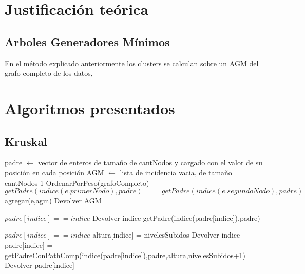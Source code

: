 \documentclass[8pt,a4paper]{article}
\begin{document}
\section{Justificación teórica}

\subsection{Arboles Generadores Mínimos}
En el método explicado anteriormente los clusters se calculan sobre un AGM del grafo completo de los datos, 

\section{Algoritmos presentados}

\subsection{Kruskal}
\begin{codebox}
		\li padre $\gets$ vector de enteros de tamaño de cantNodos y cargado con el valor de su posición en cada posición
		\li AGM $\gets$ lista de incidencia vacia, de tamaño cantNodos-1
		\li OrdenarPorPeso(grafoCompleto)
		\li {} 
			\li \Do
			\li \If $getPadre(indice(e.primerNodo), padre) == getPadre(indice(e.segundoNodo),padre)$
				\li \Then agregar(e,agm)
					\End
				\End
	\li Devolver AGM
\end{codebox}

\begin{codebox}
\li \If $padre[indice] == indice$ \Then
\li Devolver indice
\li \Else
\li getPadre(indice(padre[indice]),padre)
\li \End
\end{codebox}


\begin{codebox}
\li \If $padre[indice] == indice$ \Then
\li altura[indice] = nivelesSubidos
\li Devolver indice
\li \Else
\li padre[indice] = getPadreConPathComp(indice(padre[indice]),padre,altura,nivelesSubidos+1)
\li Devolver padre[indice]
\li \End
\end{codebox}
\end{document}
